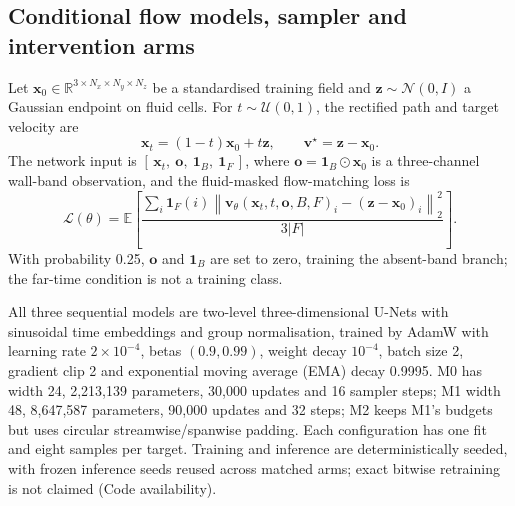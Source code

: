 \subsection{Conditional flow models, sampler and intervention arms}\label{sec:model}\label{sec:sampler}

Let $\mathbf x_0\in\mathbb R^{3\times N_x\times N_y\times N_z}$ be a standardised training field
and $\mathbf z\sim\mathcal N(0,I)$ a Gaussian endpoint on fluid cells. For
$t\sim\mathcal U(0,1)$, the rectified path and target velocity are
\cite{lipman2023flow,liu2023rectified}
\begin{equation}
 \mathbf x_t=(1-t)\mathbf x_0+t\mathbf z,\qquad
 \mathbf v^\star=\mathbf z-\mathbf x_0 .
\end{equation}
The network input is $[\,\mathbf x_t,\ \mathbf o,\ \mathbf 1_B,\ \mathbf 1_F\,]$, where
$\mathbf o=\mathbf 1_B\odot\mathbf x_0$ is a three-channel wall-band observation, and the
fluid-masked flow-matching loss is
\begin{equation}
\mathcal L(\theta)=
\mathbb E\left[
\frac{\sum_i\mathbf 1_F(i)
\left\|\mathbf v_\theta(\mathbf x_t,t,\mathbf o,B,F)_i
-(\mathbf z-\mathbf x_0)_i\right\|_2^2}{3|F|}
\right].
\label{eq:fm}
\end{equation}
With probability 0.25, $\mathbf o$ and $\mathbf 1_B$ are set to zero, training the absent-band
branch; the far-time condition is not a training class.

All three sequential models are two-level three-dimensional U-Nets with sinusoidal time embeddings
and group normalisation, trained by AdamW with learning rate $2\times10^{-4}$, betas $(0.9,0.99)$,
weight decay $10^{-4}$, batch size 2, gradient clip 2 and exponential moving average (EMA) decay 0.9995. M0 has width 24,
2,213,139 parameters, 30,000 updates and 16 sampler steps; M1 width 48, 8,647,587 parameters,
90,000 updates and 32 steps; M2 keeps M1's budgets but uses circular streamwise/spanwise padding.
Each configuration has one fit and eight samples per target. Training and inference are
deterministically seeded, with frozen inference seeds reused across matched arms; exact bitwise
retraining is not claimed (Code availability).

